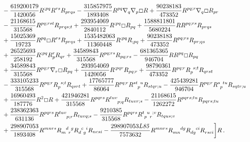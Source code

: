 \documentclass[11pt]{article}
\begin{document}
{\begin{align}
&-\frac{619200179 }{1420056} R^{;p q} R^{r s} R_{p r q s}-\frac{315857975 }{1893408} R^{p q} \nabla_q \nabla_p \Box R +\frac{90238183 }{473352} R^{p q ; r} \nabla_q \Box R_{p r}
\nonumber
\\
&-\frac{21168615}{315568} R^{p q; rst}R_{p r q s ; t}+\frac{293954069 }{2840112}R^{;pq} \Box R_{p q} +\frac{1588811801 }{5680224} R R^{p q ; r s} R_{p r q s} 
\nonumber
\\
&+\frac{15025369}{19723} R^{pq} \Box R^{r s} R_{p r q s}+\frac{1535482063 }{11360448} R^{;pq} R_{;pq} +\frac{90238183 }{473352} R^{p q ; r s} R_{p r ; q s}
\nonumber
\\
&+\frac{26525693 }{258192} R^{;p q} R_p^r R_{q r}+\frac{34589843 }{315568} R^{p q; r s} R_{p q; rs}-\frac{681365365 }{946704}R R^{pq} \Box R_{pq}
\nonumber
\\
&+\frac{34589843 }{315568} R^{p q; r} \nabla_r \Box R_{p q}+\frac{293954069 }{1420056} R^{;p q r} R_{pq;r} +\frac{98790361 }{473352} R^{pq;r} \tensor{R}{_p^{s;t}} R_{q r s t}
\nonumber
\\
&-\frac{333105233 }{315568} R^{p q; r} \tensor{R}{_p^{s;t}} R_{q s r t}+\frac{17765777 }{86064} R^{pq;r} \tensor{R}{^{st}_p^u} R_{s t q r ;u}
-\frac{425439281 }{946704} R^{p q ;r} \tensor{R}{^s_p^{tu}} R_{s q t r ;u} 
\nonumber
\\
&+\frac{16960493 }{187776} R^2 \Box R +\frac{421946281}{315568} R^{p q r s} \tensor{R}{^{tuv}_{p;q}} R_{tuvr;s} -\frac{21168615 }{1262272} R^{p q r s ; t u} R_{p q r s ; t u} 
\nonumber
\\
&+\frac{238362363 }{631136} R^{p q r s} \tensor{R}{^{tuv}_{p;r}} R_{tuvq;s}-\frac{9210385 }{315568} R^{p q r s} \tensor{R}{^t_p^u_r^{;v}} R_{t q u s ;v} 
\nonumber
\\
&+\frac{298907053 }{1893408} \tensor{R}{^{m n r s}} \tensor{R}{_m^d_r^g} \tensor{R}{_d^c_g^i} R_{n c s i}-\frac{298907053 \mathit{L85}}{7573632} \tensor{R}{^{m n r s}} \tensor{R}{_{m n} ^{ d g}} \tensor{R}{_{d g}^{c i}} \tensor{R}{_{r s c i}}\bigg] R\, .\label{L1049}
\end{align}





}
\end{document}
